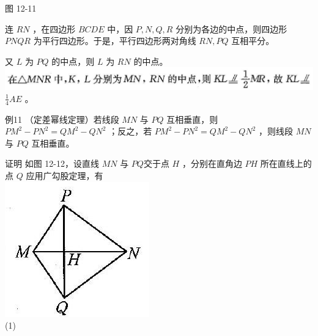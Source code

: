 \documentclass[10pt]{article}
\begin{document}
图 12-11

连 $R N$ ，在四边形 $B C D E$ 中，因 $P, N, Q, R$ 分别为各边的中点，则四边形 $P N Q R$ 为平行四边形。于是，平行四边形两对角线 $R N, P Q$ 互相平分。

又 $L$ 为 $P Q$ 的中点，则 $L$ 为 $R N$ 的中点。\\
\includegraphics[max width=\textwidth]{2024_10_30_2c8f45efd4a519b08e1ag-116(3)} $\frac{1}{4} A E$ 。

例11 （定差幂线定理）若线段 $M N$ 与 $P Q$ 互相垂直，则 $P M^{2}-P N^{2}=Q M^{2}-Q N^{2}$ ；反之，若 $P M^{2}-P N^{2}=Q M^{2}-Q N^{2}$ ，则线段 $M N$ 与 $P Q$ 互相垂直。

证明 如图 12-12，设直线 $M N$ 与 $P Q$交于点 $H$ ，分别在直角边 $P H$ 所在直线上的点 $Q$ 应用广勾股定理，有\\
\includegraphics[max width=\textwidth, center]{2024_10_30_2c8f45efd4a519b08e1ag-116(1)}\\
(1)\\
\end{document}
